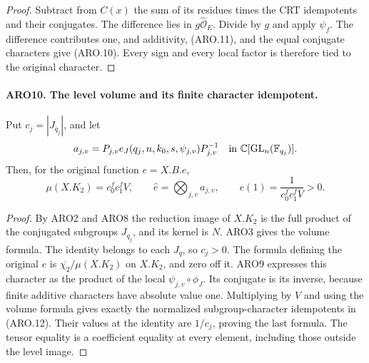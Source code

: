 \documentclass[11pt,a4paper]{article}
\numberwithin{equation}{section}
\theoremstyle{remark}\newtheorem{remark}[theorem]{Remark}
\begin{document}
\begin{proof}
Subtract from \(C(x)\) the sum of its residues times the CRT
idempotents and their conjugates.  The difference lies in
\(g\widehat{\mathcal O}_E\).  Divide by \(g\) and apply \(\psi_f\).
The difference contributes one, and additivity, (ARO.11), and the
equal conjugate characters give (ARO.10).  Every sign and every
local factor is therefore tied to the original character.
\end{proof}

\paragraph{ARO10. The level volume and its finite character idempotent.}
\label{claim:ARO10}
Put \(c_j=|J_{q_j}|\), and let
\[
 a_{j,v}=P_{j,v}e_J(q_j,n,k_0,s,\psi_{j,v})P_{j,v}^{-1}
                 \quad\hbox{in }\mathbb C[\mathrm{GL}_n(\mathbb F_{q_j})].
\]
Then, for the original function \(e=X.B.e\),
\[
 \mu(X.K_2)=c_0^f c_1^f V,
 \qquad \widehat e=\bigotimes_{j,v}a_{j,v},
 \qquad e(1)=\frac1{c_0^f c_1^f V}>0.                 \tag{ARO.12}
\]
\begin{proof}
By ARO2 and ARO8 the reduction image of \(X.K_2\) is the full
product of the conjugated subgroups \(J_{q_j}\), and its kernel is
\(N\).  ARO3 gives the volume formula.  The identity belongs to
each \(J_q\), so \(c_j>0\).  The formula defining the original
\(e\) is \(\overline{\chi_2}/\mu(X.K_2)\) on \(X.K_2\),
and zero off it.  ARO9 expresses this character as the product of
the local \(\psi_{j,v}\circ\phi_J\).  Its conjugate is its
inverse, because finite additive characters have absolute value
one.  Multiplying by \(V\) and using the volume formula gives
exactly the normalized subgroup-character idempotents in (ARO.12).
Their values at the identity are \(1/c_j\), proving the last
formula.  The tensor equality is a coefficient equality at every
element, including those outside the level image.
\end{proof}

\end{document}
